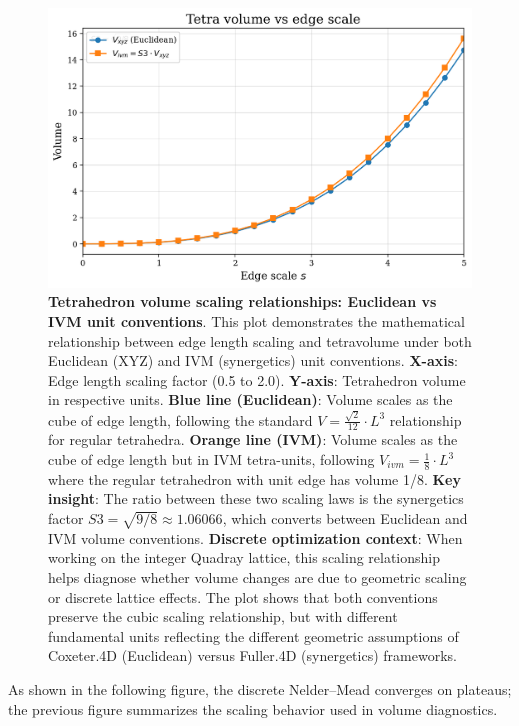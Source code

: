 \documentclass[
  10pt,
]{article}
\begin{document}
\begin{figure}
\centering
\includegraphics{../output/figures/volumes_scale_plot.png}
\caption{\textbf{Tetrahedron volume scaling relationships: Euclidean vs
IVM unit conventions}. This plot demonstrates the mathematical
relationship between edge length scaling and tetravolume under both
Euclidean (XYZ) and IVM (synergetics) unit conventions. \textbf{X-axis}:
Edge length scaling factor (0.5 to 2.0). \textbf{Y-axis}: Tetrahedron
volume in respective units. \textbf{Blue line (Euclidean)}: Volume
scales as the cube of edge length, following the standard
\(V = \frac{\sqrt{2}}{12} \cdot L^3\) relationship for regular
tetrahedra. \textbf{Orange line (IVM)}: Volume scales as the cube of
edge length but in IVM tetra-units, following
\(V_{ivm} = \frac{1}{8} \cdot L^3\) where the regular tetrahedron with
unit edge has volume 1/8. \textbf{Key insight}: The ratio between these
two scaling laws is the synergetics factor
\(S3 = \sqrt{9/8} \approx 1.06066\), which converts between Euclidean
and IVM volume conventions. \textbf{Discrete optimization context}: When
working on the integer Quadray lattice, this scaling relationship helps
diagnose whether volume changes are due to geometric scaling or discrete
lattice effects. The plot shows that both conventions preserve the cubic
scaling relationship, but with different fundamental units reflecting
the different geometric assumptions of Coxeter.4D (Euclidean) versus
Fuller.4D (synergetics) frameworks.}
\end{figure}

As shown in the following figure, the discrete Nelder--Mead converges on
plateaus; the previous figure summarizes the scaling behavior used in
volume diagnostics.
\end{document}
